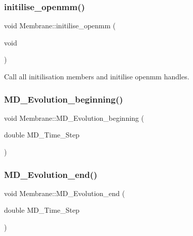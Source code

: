 \subsubsection{\texorpdfstring{initilise\_openmm()}{initilise\_openmm()}}
{\footnotesize\ttfamily void Membrane\+::initilise\+\_\+openmm (\begin{DoxyParamCaption}\item[{void}]{ }\end{DoxyParamCaption})}



Call all initilisation members and initilise openmm handles. 

\mbox{\label{classMembrane_a718a254c0f843b06e07d0aad8451b652}} 
\subsubsection{\texorpdfstring{MD\_Evolution\_beginning()}{MD\_Evolution\_beginning()}}
{\footnotesize\ttfamily void Membrane\+::\+M\+D\+\_\+\+Evolution\+\_\+beginning (\begin{DoxyParamCaption}\item[{double}]{M\+D\+\_\+\+Time\+\_\+\+Step }\end{DoxyParamCaption})}

\mbox{\label{classMembrane_a5292913dd4500db14e26147920a21e58}} 
\subsubsection{\texorpdfstring{MD\_Evolution\_end()}{MD\_Evolution\_end()}}
{\footnotesize\ttfamily void Membrane\+::\+M\+D\+\_\+\+Evolution\+\_\+end (\begin{DoxyParamCaption}\item[{double}]{M\+D\+\_\+\+Time\+\_\+\+Step }\end{DoxyParamCaption})}

\mbox{\label{classMembrane_aca9785ad0ab2514006a46c0c9bd8cf5c}} 
